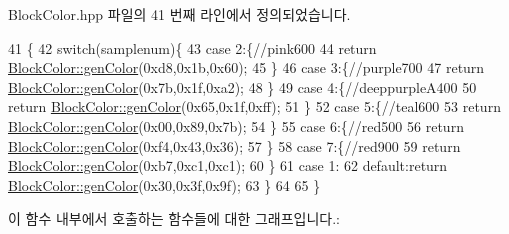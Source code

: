 Block\+Color.\+hpp 파일의 41 번째 라인에서 정의되었습니다.


\begin{DoxyCode}
41                                                                              \{
42                 \textcolor{keywordflow}{switch}(samplenum)\{
43                     \textcolor{keywordflow}{case} 2:\{\textcolor{comment}{//pink600}
44                         \textcolor{keywordflow}{return} \hyperlink{class_tetris_1_1_block_sub_modules_1_1_block_color_a479cf23117afea6237a4fd69bc4652ba}{BlockColor::genColor}(0xd8,0x1b,0x60);
45                     \}
46                     \textcolor{keywordflow}{case} 3:\{\textcolor{comment}{//purple700}
47                         \textcolor{keywordflow}{return} \hyperlink{class_tetris_1_1_block_sub_modules_1_1_block_color_a479cf23117afea6237a4fd69bc4652ba}{BlockColor::genColor}(0x7b,0x1f,0xa2);
48                     \}
49                     \textcolor{keywordflow}{case} 4:\{\textcolor{comment}{//deeppurpleA400}
50                         \textcolor{keywordflow}{return} \hyperlink{class_tetris_1_1_block_sub_modules_1_1_block_color_a479cf23117afea6237a4fd69bc4652ba}{BlockColor::genColor}(0x65,0x1f,0xff);
51                     \}
52                     \textcolor{keywordflow}{case} 5:\{\textcolor{comment}{//teal600}
53                         \textcolor{keywordflow}{return} \hyperlink{class_tetris_1_1_block_sub_modules_1_1_block_color_a479cf23117afea6237a4fd69bc4652ba}{BlockColor::genColor}(0x00,0x89,0x7b);
54                     \}
55                     \textcolor{keywordflow}{case} 6:\{\textcolor{comment}{//red500}
56                         \textcolor{keywordflow}{return} \hyperlink{class_tetris_1_1_block_sub_modules_1_1_block_color_a479cf23117afea6237a4fd69bc4652ba}{BlockColor::genColor}(0xf4,0x43,0x36);
57                     \}
58                     \textcolor{keywordflow}{case} 7:\{\textcolor{comment}{//red900}
59                         \textcolor{keywordflow}{return} \hyperlink{class_tetris_1_1_block_sub_modules_1_1_block_color_a479cf23117afea6237a4fd69bc4652ba}{BlockColor::genColor}(0xb7,0xc1,0xc1);
60                     \}
61                     \textcolor{keywordflow}{case} 1:
62                     \textcolor{keywordflow}{default}:\textcolor{keywordflow}{return} \hyperlink{class_tetris_1_1_block_sub_modules_1_1_block_color_a479cf23117afea6237a4fd69bc4652ba}{BlockColor::genColor}(0x30,0x3f,0x9f);
63                 \}
64                 
65             \}
\end{DoxyCode}
이 함수 내부에서 호출하는 함수들에 대한 그래프입니다.\+:
